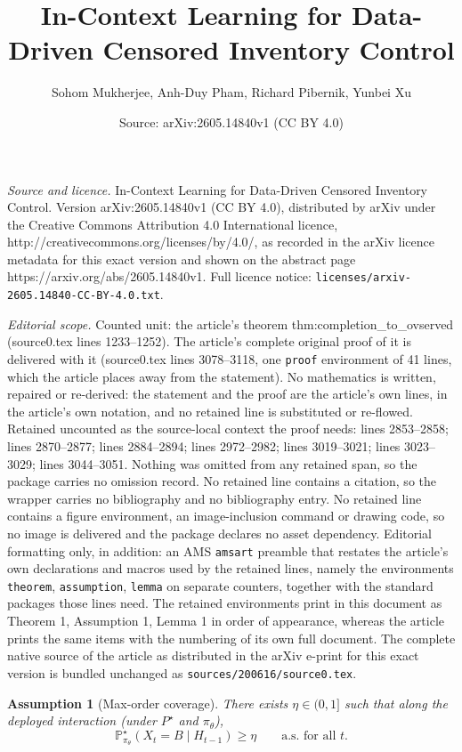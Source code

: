 \documentclass[10pt,a4paper]{amsart}
\title{In-Context Learning for Data-Driven Censored Inventory Control}
\author{Sohom Mukherjee, Anh-Duy Pham, Richard Pibernik, Yunbei Xu}
\date{Source: arXiv:2605.14840v1 (CC BY 4.0)}
\newtheorem{assumption}{Assumption}
\begin{document}
\maketitle

\noindent\emph{Source and licence.} In-Context Learning for Data-Driven Censored Inventory Control. Version arXiv:2605.14840v1 (CC BY 4.0), distributed by arXiv under the Creative Commons Attribution 4.0 International licence, http://creativecommons.org/licenses/by/4.0/, as recorded in the arXiv licence metadata for this exact version and shown on the abstract page https://arxiv.org/abs/2605.14840v1. Full licence notice: \texttt{licenses/arxiv-2605.14840-CC-BY-4.0.txt}.\par\smallskip

\noindent\textit{Editorial scope.} Counted unit: the article's theorem thm:completion\_to\_ovserved (source0.tex lines 1233--1252). The article's complete original proof of it is delivered with it (source0.tex lines 3078--3118, one \texttt{proof} environment of 41 lines, which the article places away from the statement). No mathematics is written, repaired or re-derived: the statement and the proof are the article's own lines, in the article's own notation, and no retained line is substituted or re-flowed.  Retained uncounted as the source-local context the proof needs: lines 2853--2858; lines 2870--2877; lines 2884--2894; lines 2972--2982; lines 3019--3021; lines 3023--3029; lines 3044--3051.  Nothing was omitted from any retained span, so the package carries no omission record.  No retained line contains a citation, so the wrapper carries no bibliography and no bibliography entry.  No retained line contains a figure environment, an image-inclusion command or drawing code, so no image is delivered and the package declares no asset dependency.  Editorial formatting only, in addition: an AMS \texttt{amsart} preamble that restates the article's own declarations and macros used by the retained lines, namely the environments \texttt{theorem}, \texttt{assumption}, \texttt{lemma} on separate counters, together with the standard packages those lines need.  The retained environments print in this document as Theorem 1, Assumption 1, Lemma 1 in order of appearance, whereas the article prints the same items with the numbering of its own full document.  The complete native source of the article as distributed in the arXiv e-print for this exact version is bundled unchanged as \texttt{sources/200616/source0.tex}.
\begin{assumption}[Max-order coverage]\label{ass:coverage}
There exists $\eta\in(0,1]$ such that along the deployed interaction (under $P^\star$ and $\pi_\theta$),
\[
\mathbb{P}^\star_{\pi_\theta}(X_t=B \mid H_{t-1}) \ge \eta\qquad\text{a.s. for all }t.
\]
\end{assumption}
\end{document}
